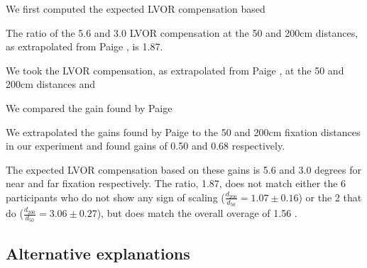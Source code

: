 

We first computed the expected LVOR compensation based 

The ratio of the 5.6 and 3.0 \textdegree LVOR compensation at the 50 and 200cm distances, as extrapolated from Paige \citeyear{1989}, is 1.87.

We took the LVOR compensation, as extrapolated from Paige \citeyear{paige1989}, at the 50 and 200cm distances and 


We compared the gain found by Paige \citeyear{paige1989} 

We extrapolated the gains found by Paige \citeyear{paige1989} to the 50 and 200cm fixation distances in our experiment and found gains of 0.50 and 0.68 respectively.

The expected LVOR compensation based on these gains is 5.6 and 3.0 degrees for near and far fixation respectively. The ratio, 1.87, does not match either the 6 participants who do not show any sign of scaling ($\frac{d_{200}}{d_{50}} = 1.07 \pm 0.16$) or the 2 that do ($\frac{d_{200}}{d_{50}} = 3.06 \pm 0.27$), but does match the overall overage of  1.56 .


%
%






\subsection{Alternative explanations}

